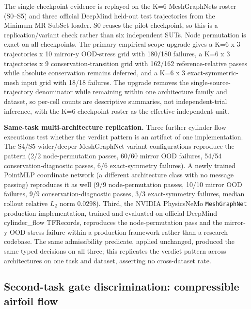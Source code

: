 \documentclass[preprint,12pt,authoryear]{elsarticle}
\begin{document}
The single-checkpoint evidence is replayed on the K=6 MeshGraphNets roster (S0--S5) and three official DeepMind held-out test trajectories from the Minimum-MR-SubSet loader. S0 reuses the pilot checkpoint, so this is a replication/variant check rather than six independent SUTs. Node permutation is exact on all checkpoints. The primary empirical scope upgrade gives a K=6 x 3 trajectories x 10 mirror-y OOD-stress grid with 180/180 failures, a K=6 x 3 trajectories x 9 conservation-transition grid with 162/162 reference-relative passes while absolute conservation remains deferred, and a K=6 x 3 exact-symmetric-mesh input grid with 18/18 failures. The upgrade removes the single-source-trajectory denominator while remaining within one architecture family and dataset, so per-cell counts are descriptive summaries, not independent-trial inference, with the K=6 checkpoint roster as the effective independent unit.

\textbf{Same-task multi-architecture replication.} Three further cylinder-flow executions test whether the verdict pattern is an artifact of one implementation. The S4/S5 wider/deeper MeshGraphNet variant configurations reproduce the pattern (2/2 node-permutation passes, 60/60 mirror OOD failures, 54/54 conservation-diagnostic passes, 6/6 exact-symmetry failures). A newly trained PointMLP coordinate network (a different architecture class with no message passing) reproduces it as well (9/9 node-permutation passes, 10/10 mirror OOD failures, 9/9 conservation-diagnostic passes, 3/3 exact-symmetry failures, median rollout relative \(L_2\) norm 0.0298). Third, the NVIDIA PhysicsNeMo \texttt{MeshGraphNet} production implementation, trained and evaluated on official DeepMind cylinder\_flow TFRecords, reproduces the node-permutation pass and the mirror-y OOD-stress failure within a production framework rather than a research codebase. The same admissibility predicate, applied unchanged, produced the same typed decisions on all three; this replicates the verdict pattern across architectures on one task and dataset, asserting no cross-dataset rate.

\subsection{Second-task gate discrimination: compressible airfoil flow}
\label{subsec:second-task}
\end{document}
